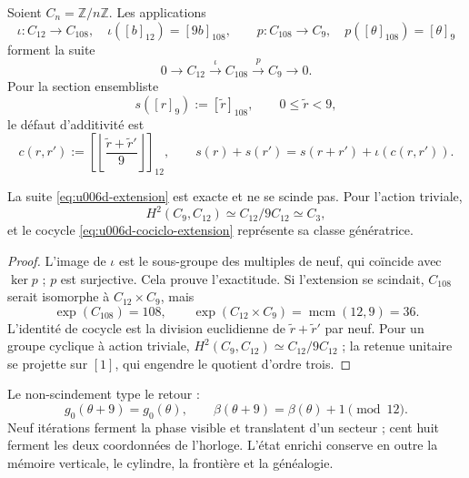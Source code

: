 Soient \(C_n=\mathbb Z/n\mathbb Z\). Les applications
\begin{equation}
 \iota:C_{12}\longrightarrow C_{108},
 \quad \iota([b]_{12})=[9b]_{108},
 \qquad
 p:C_{108}\longrightarrow C_9,
 \quad p([\theta]_{108})=[\theta]_9
 \label{eq:u006d-mapas-extension}
\end{equation}
forment la suite
\begin{equation}
 0\longrightarrow C_{12}
 \xrightarrow{\;\iota\;}C_{108}
 \xrightarrow{\;p\;}C_9
 \longrightarrow0.
 \label{eq:u006d-extension}
\end{equation}
Pour la section ensembliste
\[
 s([r]_9):=[\widetilde r]_{108},
 \qquad 0\leq\widetilde r<9,
\]
le défaut d’additivité est
\begin{equation}
 c(r,r'):=
 \left[
 \left\lfloor
 \frac{\widetilde r+\widetilde r'}9
 \right\rfloor
 \right]_{12},
 \qquad
 s(r)+s(r')
 =s(r+r')+\iota(c(r,r')).
 \label{eq:u006d-cociclo-extension}
\end{equation}

\begin{theorem}
\label{thm:u006d-extension-no-escindida}
La suite \eqref{eq:u006d-extension} est exacte et ne se scinde pas. Pour
l’action triviale,
\begin{equation}
 H^2(C_9,C_{12})
 \simeq C_{12}/9C_{12}
 \simeq C_3,
 \label{eq:u006d-cohomologia-extension}
\end{equation}
et le cocycle \eqref{eq:u006d-cociclo-extension} représente sa classe
génératrice.
\end{theorem}

\begin{proof}
L’image de \(\iota\) est le sous-groupe des multiples de neuf, qui coïncide
avec \(\ker p\) ; \(p\) est surjective. Cela prouve l’exactitude. Si
l’extension se scindait, \(C_{108}\) serait isomorphe à
\(C_{12}\times C_9\), mais
\[
 \exp(C_{108})=108,
 \qquad
 \exp(C_{12}\times C_9)=\operatorname{mcm}(12,9)=36.
\]
L’identité de cocycle est la division euclidienne de
\(\widetilde r+\widetilde r'\) par neuf. Pour un groupe cyclique à action
triviale,
\(H^2(C_9,C_{12})\simeq C_{12}/9C_{12}\) ; la retenue unitaire se projette sur
\([1]\), qui engendre le quotient d’ordre trois.
\end{proof}

Le non-scindement type le retour :
\[
 g_0(\theta+9)=g_0(\theta),
 \qquad
 \beta(\theta+9)=\beta(\theta)+1\pmod{12}.
\]
Neuf itérations ferment la phase visible et translatent d’un secteur ; cent
huit ferment les deux coordonnées de l’horloge. L’état enrichi conserve
en outre la mémoire verticale, le cylindre, la frontière et la généalogie.

